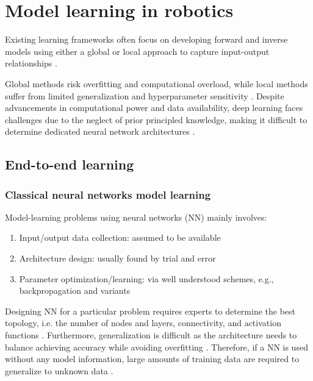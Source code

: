 
\section{Model learning in robotics}
Existing learning frameworks often focus on developing forward and inverse models using either a global or local approach to capture input-output relationships \cite{NguyenTuong2011Modellearningrobot}.

Global methods risk overfitting and computational overload, while local methods suffer from limited generalization and hyperparameter sensitivity \cite{Thrun2002Probabilisticrobotics,Goodfellow2016DeepLearning}. Despite advancements in computational power and data availability, deep learning faces challenges due to the neglect of prior principled knowledge, making it difficult to determine dedicated neural network architectures \cite{Baker2017Designingneuralnetwork,Elsken2019Neuralarchitecturesearch}. 

\subsection{End-to-end learning}

\subsubsection{Classical neural networks model learning}
Model-learning problems using neural networks (NN) mainly involves:
\begin{enumerate}
	\item Input/output data collection: assumed to be available
	\item Architecture design: usually found by trial and error
	\item Parameter optimization/learning: via well understood schemes, e.g., backpropagation and variants
\end{enumerate}
Designing NN for a particular problem requires experts to determine the best topology, i.e. the number of nodes and layers, connectivity, and activation functions \cite{Matteucci2006ELeaRNTEvolutionarylearning}. Furthermore, generalization is difficult as the architecture needs to balance achieving accuracy while avoiding overfitting \cite{Rocha2005Simultaneousevolutionneural,He2015Topologicaloptimisationartificial,Matteucci2006ELeaRNTEvolutionarylearning,Kwok1995Constructivefeedforwardneural,Lawrence1998Whatsizeneural,Talebi2010NeuralNetworkBased}. Therefore, if a NN is used without any model information, large amounts of training data are required to generalize to unknown data \cite{Urolagin2012Generalizationcapabilityartificial}.

